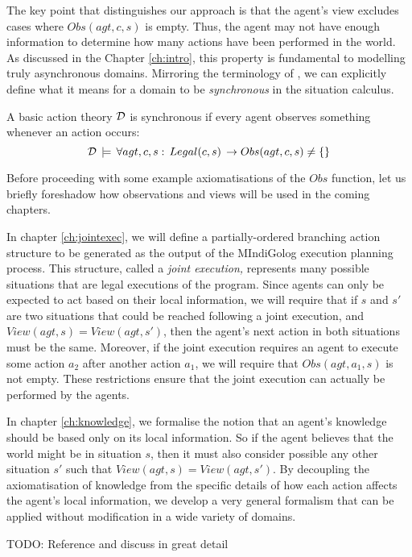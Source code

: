 The key point that distinguishes our approach is that the agent's
view excludes cases where $Obs(agt,c,s)$ is empty. Thus, the agent
may not have enough information to determine how many actions have
been performed in the world. As discussed in the Chapter \ref{ch:intro},
this property is fundamental to modelling truly asynchronous domains.
Mirroring the terminology of \citep{vanBentham06tree_of_knowledge},
we can explicitly define what it means for a domain to be \emph{synchronous}
in the situation calculus.

\begin{defnL}
 A basic action theory $\mathcal{D}$
is synchronous if every agent observes something whenever an action
occurs:\[
\mathcal{D}\,\models\,\forall agt,c,s:\, Legal(c,s)\,\rightarrow Obs(agt,c,s)\neq\{\}\]

\end{defnL}
Before proceeding with some example axiomatisations of the $Obs$
function, let us briefly foreshadow how observations and views will
be used in the coming chapters.

In chapter \ref{ch:jointexec}, we will define a partially-ordered
branching action structure to be generated as the output of the MIndiGolog
execution planning process. This structure, called a \emph{joint execution,}
represents many possible situations that are legal executions of the
program. Since agents can only be expected to act based on their local
information, we will require that if $s$ and $s'$ are two situations
that could be reached following a joint execution, and $View(agt,s)=View(agt,s')$,
then the agent's next action in both situations must be the same.
Moreover, if the joint execution requires an agent to execute some
action $a_{2}$ after another action $a_{1}$, we will require that
$Obs(agt,a_{1},s)$ is not empty. These restrictions ensure that the
joint execution can actually be performed by the agents.

In chapter \ref{ch:knowledge}, we formalise the notion that an agent's
knowledge should be based only on its local information. So if the
agent believes that the world might be in situation $s$, then it
must also consider possible any other situation $s'$ such that $View(agt,s)=View(agt,s')$.
By decoupling the axiomatisation of knowledge from the specific details
of how each action affects the agent's local information, we develop
a very general formalism that can be applied without modification
in a wide variety of domains.

TODO: Reference and discuss \citep{pinto98sc_observations} in great
detail


